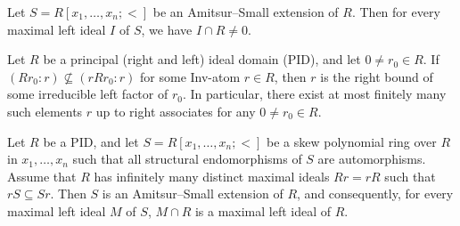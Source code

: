 \documentclass[10pt,a4paper]{amsart}
\begin{document}
		\begin{proposition}\label{prop: ASextensions}
			Let $S=R[x_1,\dots,x_n;<]$ be an Amitsur--Small extension of $R$. Then for every maximal left ideal $I$ of $S$, we have $I\cap R\neq 0$.
		\end{proposition}

		\begin{lemma}\label{lem: LemmaA-Inv}
		Let $R$ be a principal (right and left) ideal domain (PID), and let $0\neq r_0\in R$. If 
		$(Rr_0:r)\nsubseteq (rRr_0:r)$
		for some Inv-atom $r\in R$, then $r$ is the right bound of some irreducible left factor of $r_0$. In particular, there exist at most finitely many such elements $r$ up to right associates for any $0\neq r_0\in R$. 
	\end{lemma}

		\begin{theorem}\label{thm: A-Inv}
			Let $R$ be a PID, and let 
			$S=R[x_1,\dots,x_n;<]$ be a skew polynomial ring over $R$ in $x_1,\dots,x_n$  such that all structural endomorphisms of \(S\)  are automorphisms. 
			 Assume that  $R$ has  infinitely many distinct maximal ideals $Rr=rR$ such that $rS\subseteq Sr$. 
			Then  $S$ is an Amitsur--Small extension of $R$, and consequently, for every maximal left ideal \(M\) of \(S\), \(M\cap R\) is a maximal left ideal of \(R\).     
		\end{theorem}
\end{document}
